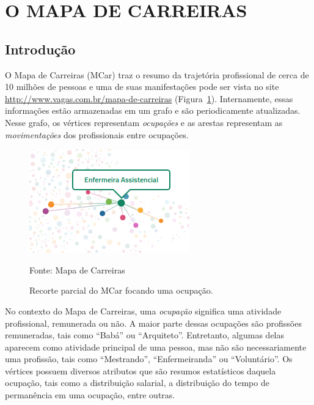 \documentclass[12pt,a4paper]{article}
\newcommand{\source}[1]{\vspace{-10pt} \caption*{Fonte: {#1}} }
\begin{document}
\section{O MAPA DE CARREIRAS}

\subsection{Introdução}

O Mapa de Carreiras (MCar) traz o resumo da trajetória profissional de cerca de 10 milhões de pessoas e uma de suas manifestações pode ser vista no site \url{http://www.vagas.com.br/mapa-de-carreiras} (Figura~\ref{fig:exemplo-grafo}). Internamente, essas informações estão armazenadas em um grafo e são periodicamente atualizadas. Nesse grafo, os vértices representam \textit{ocupações} e as arestas representam as \textit{movimentações} dos profissionais entre ocupações.

\begin{figure}[ht]
  \centering
  \includegraphics[scale=0.8, frame]{mapa-enfermeira-assistencial.png}
  \caption{Recorte parcial do MCar focando uma ocupação.}
  \source{Mapa de Carreiras}
  \label{fig:exemplo-grafo}
\end{figure}


No contexto do Mapa de Carreiras, uma \textit{ocupação} significa uma atividade profissional, remunerada ou não. A maior parte dessas ocupações são profissões remuneradas, tais como \enquote{Babá} ou \enquote{Arquiteto}. Entretanto, algumas delas aparecem como atividade principal de uma pessoa, mas não são necessariamente uma profissão, tais como \enquote{Mestrando}, \enquote{Enfermeiranda} ou \enquote{Voluntário}. Os vértices possuem diversos atributos que são resumos estatísticos daquela ocupação, tais como a distribuição salarial, a distribuição do tempo de permanência em uma ocupação, entre outras.
\end{document}
